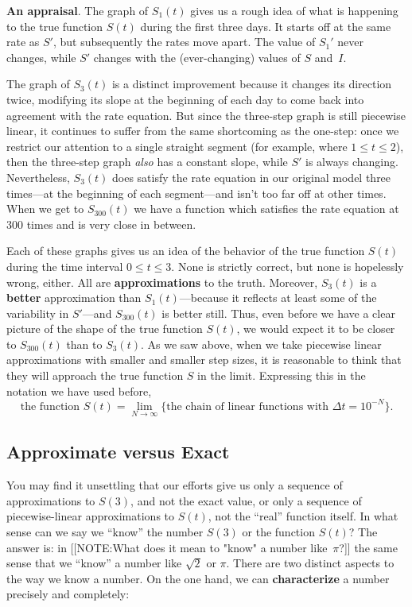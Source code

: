 \textbf{An appraisal}.  The graph of $S_{1}(t)$ gives us a rough idea
 of what is happening to the true function $S(t)$ during the first
 three days.  It starts off at the same rate as $S'$, but subsequently
 the rates move apart.  The value of $S_{1}'$ never changes, while
 $S'$ changes with the (ever-changing) values of $S$ and~$I$.

The graph of $S_{3}(t)$ is a distinct improvement because it changes
 its direction twice, modifying its slope at the beginning of each day
 to come back into agreement with the rate equation.  But since the
 three-step graph is still piecewise linear, it continues to suffer
 from the same shortcoming as the one-step: once we restrict our
 attention to a single straight segment (for example, where $1 \leq t
 \leq 2$), then the three-step graph {\em also\/} has a constant
 slope, while $S'$ is always changing.  Nevertheless, $S_{3}(t)$ does
 satisfy the rate equation in our original model three times---at the
 beginning of each segment---and isn't too far off at other
 times. When we get to $S_{300}(t)$ we have a function which satisfies
 the rate equation at 300 times and is very close in between.

Each of these graphs gives us an idea of the behavior of the true
 function $S(t)$ during the time interval $0 \leq t \leq 3$.  None is
 strictly correct, but none is hopelessly wrong, either.  All are {\bf
 approximations} to the truth.  Moreover, $S_{3}(t)$ is a {\bf better}
 approximation than $S_{1}(t)$---because it reflects at least some of
 the variability in $S'$---and $S_{300}(t)$ is better still.  Thus,
 even before we have a clear picture of the shape of the true function
 $S(t)$, we would expect it to be closer to $S_{300}(t)$ than to
 $S_{3}(t)$. As we saw above, when we take piecewise linear
 approximations with smaller and smaller step sizes, it is reasonable
 to think that they will approach the true function $S$ in the limit.
Expressing this in the notation we have used before,
\[
\mbox{the function } S(t) =\lim_{N \to \infty} 
   \{\mbox{the chain of linear functions with $\Delta t = 10^{-N}$}\}.
\]



\subsection{Approximate versus Exact}
\label{subsec:approximate-versus-exact}

You may find it unsettling that our efforts give us only a sequence of
 approximations to $S(3)$, and not the exact value, or only a sequence
 of piecewise-linear approximations to $S(t)$, not the ``real''
 function itself.  In what sense can we say we ``know'' the number
 $S(3)$ or the function $S(t)$?  The answer is: in
[[NOTE:What does it mean  to "know" a number like~$\pi$?]]
the same sense that we ``know'' a number like $\sqrt{2}$ or $\pi$.
  There are two distinct aspects to the way we know a number.  On the
 one hand, we can {\bf characterize} a number precisely and
 completely:


